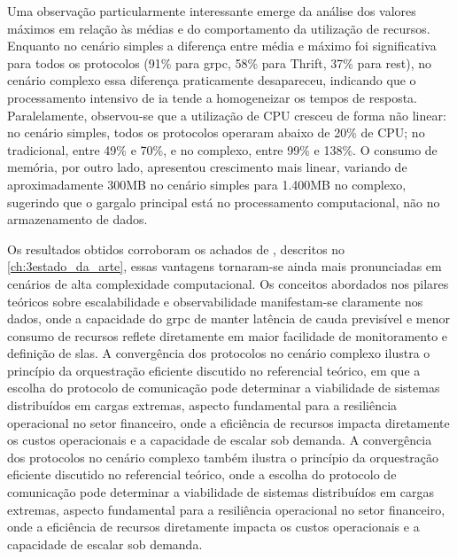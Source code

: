 Uma observação particularmente interessante emerge da análise dos valores máximos em relação às médias e do comportamento da utilização de recursos. Enquanto no cenário simples a diferença entre média e máximo foi significativa para todos os protocolos (91\% para \gls{grpc}, 58\% para Thrift, 37\% para \gls{rest}), no cenário complexo essa diferença praticamente desapareceu, indicando que o processamento intensivo de \gls{ia} tende a homogeneizar os tempos de resposta. Paralelamente, observou-se que a utilização de CPU cresceu de forma não linear: no cenário simples, todos os protocolos operaram abaixo de 20\% de CPU; no tradicional, entre 49\% e 70\%, e no complexo, entre 99\% e 138\%. O consumo de memória, por outro lado, apresentou crescimento mais linear, variando de aproximadamente 300MB no cenário simples para 1.400MB no complexo, sugerindo que o gargalo principal está no processamento computacional, não no armazenamento de dados.

Os resultados obtidos corroboram os achados de \textcite{niswar_performance_2024}, descritos no \autoref{ch:3estado_da_arte}, essas vantagens tornaram-se ainda mais pronunciadas em cenários de alta complexidade computacional. Os conceitos abordados nos pilares teóricos sobre escalabilidade e observabilidade manifestam-se claramente nos dados, onde a capacidade do \gls{grpc} de manter latência de cauda previsível e menor consumo de recursos reflete diretamente em maior facilidade de monitoramento e definição de \acrshort{sla}s. A convergência dos protocolos no cenário complexo ilustra o princípio da orquestração eficiente discutido no referencial teórico, em que a escolha do protocolo de comunicação pode determinar a viabilidade de sistemas distribuídos em cargas extremas, aspecto fundamental para a resiliência operacional no setor financeiro, onde a eficiência de recursos impacta diretamente os custos operacionais e a capacidade de escalar sob demanda. A convergência dos protocolos no cenário complexo também ilustra o princípio da orquestração eficiente discutido no referencial teórico, onde a escolha do protocolo de comunicação pode determinar a viabilidade de sistemas distribuídos em cargas extremas, aspecto fundamental para a resiliência operacional no setor financeiro, onde a eficiência de recursos diretamente impacta os custos operacionais e a capacidade de escalar sob demanda.